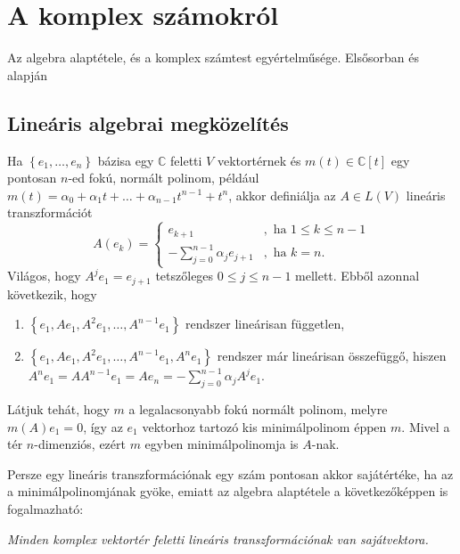 \documentclass[9pt, showtrims]{memoir}
\theoremstyle{plain}
\theoremstyle{remark}
\theoremstyle{definition}
\begin{document}
\appendix
\renewcommand{\appendixpagename}{Függelékek}\renewcommand{\appendixtocname}{\appendixpagename}
\appendixpage
\chapter{A komplex számokról}
Az algebra alaptétele, és a komplex számtest egyértelműsége. Elsősorban \parencite{MR1415833} és \parencite{10.2307/3647746} alapján
\section{Lineáris algebrai megközelítés}
Ha $\left\{ e_1,\dots,e_n \right\}$ bázisa egy $\mathbb{C}$ feletti $V$ vektortérnek
és $m\left( t \right)\in\mathbb{C}\left[ t \right]$ egy pontosan $n$-ed fokú, 
normált polinom,
például
$m\left( t \right)=\alpha_0+\alpha_1 t+\dots+\alpha_{n-1}t^{n-1}+t^{n}$,
akkor definiálja az $A\in L\left( V \right)$ lineáris transzformációt
\[
    A\left( e_k \right)=
    \begin{cases}
        e_{k+1}&, \text{ ha } 1\leq k \leq n-1\\
        -\sum_{j=0}^{n-1}\alpha_j e_{j+1}&, \text{ ha } k=n.
    \end{cases}
\]
Világos, hogy $A^je_1=e_{j+1}$ tetszőleges $0\leq j\leq n-1$ mellett.
Ebből azonnal következik, hogy 
\begin{enumerate}
    \item 
    $\left\{ e_1, Ae_1,A^2e_1,\dots,A^{n-1}e_1\right\}$ rendszer lineárisan független,
    \item
    $\left\{ e_1, Ae_1,A^2e_1,\dots,A^{n-1}e_1,A^ne_1\right\}$ rendszer már lineárisan összefüggő,
    hiszen
    $A^ne_1=AA^{n-1}e_1=Ae_n=-\sum_{j=0}^{n-1}\alpha_j A^je_1$.
\end{enumerate}
Látjuk tehát, hogy $m$ a legalacsonyabb fokú normált polinom, melyre
$m\left( A \right)e_1=0$,
így az $e_1$ vektorhoz tartozó kis minimálpolinom éppen $m$.
Mivel a tér $n$-dimenziós, ezért $m$ egyben minimálpolinomja is $A$-nak.

Persze egy lineáris transzformációnak egy szám pontosan akkor sajátértéke,
ha az a minimálpolinomjának gyöke,
emiatt 
az algebra alaptétele a következőképpen is fogalmazható:
\begin{center}
\emph{Minden komplex vektortér feletti lineáris transzformációnak van sajátvektora.}
\end{center}
\end{document}

